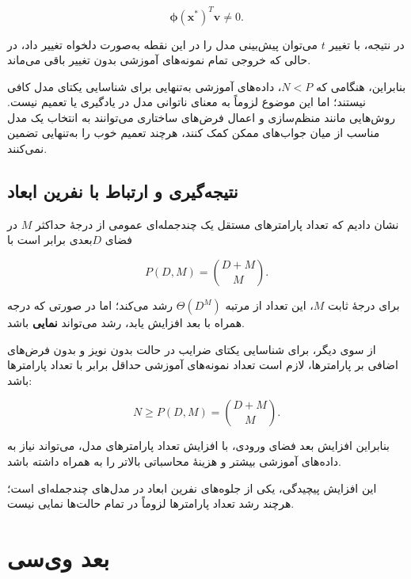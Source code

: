 \documentclass[12pt,a4paper]{article}
\newcommand{\en}[1]{\lr{#1}}
\begin{document}
\[
\boldsymbol{\phi}(\mathbf{x}^{*})^T\mathbf{v}\neq0.
\]

در نتیجه، با تغییر $t$ می‌توان پیش‌بینی مدل
را در این نقطه به‌صورت دلخواه تغییر داد،
در حالی که خروجی تمام نمونه‌های آموزشی
بدون تغییر باقی می‌ماند.

بنابراین، هنگامی که $N<P$،
داده‌های آموزشی به‌تنهایی برای شناسایی
یکتای مدل کافی نیستند؛ اما این موضوع
لزوماً به معنای ناتوانی مدل در یادگیری
یا تعمیم نیست. روش‌هایی مانند منظم‌سازی
\LTRfootnote{\en{Regularization}} و اعمال فرض‌های ساختاری
می‌توانند به انتخاب یک مدل مناسب از میان
جواب‌های ممکن کمک کنند، هرچند تعمیم خوب
را به‌تنهایی تضمین نمی‌کنند.



\subsection{نتیجه‌گیری و ارتباط با نفرین ابعاد}

نشان دادیم که تعداد پارامترهای مستقل
یک چندجمله‌ای عمومی از درجۀ حداکثر $M$
در فضای $D$بعدی برابر است با

\[
P(D,M)=\binom{D+M}{M}.
\]

برای درجۀ ثابت $M$، این تعداد از مرتبه
$\Theta(D^M)$ رشد می‌کند؛
اما در صورتی که درجه همراه با بعد
افزایش یابد، رشد می‌تواند \textbf{نمایی} باشد.

از سوی دیگر، برای شناسایی یکتای
ضرایب در حالت بدون نویز و بدون
فرض‌های اضافی بر پارامترها،
لازم است تعداد نمونه‌های آموزشی
حداقل برابر با تعداد پارامترها باشد:

\[
\boxed{
N\geq P(D,M)=\binom{D+M}{M}.
}
\]

بنابراین افزایش بعد فضای ورودی،
با افزایش تعداد پارامترهای مدل،
می‌تواند نیاز به داده‌های آموزشی
بیشتر و هزینۀ محاسباتی بالاتر را
به همراه داشته باشد.

این افزایش پیچیدگی، یکی از
جلوه‌های نفرین ابعاد
در مدل‌های چندجمله‌ای است؛
هرچند رشد تعداد پارامترها
لزوماً در تمام حالت‌ها نمایی نیست.




\section{بعد وی‌سی}
\end{document}
